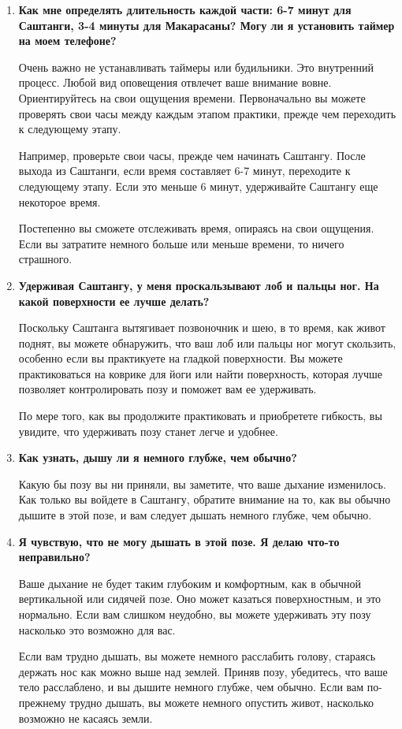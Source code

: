 \documentclass[
a4paper, %
12pt, %
article,
onecolumn, %
openany, %
]{memoir}
\begin{document}
\begin{enumerate}
\item \textbf{Как мне определять длительность каждой части: 6-7 минут для Саштанги, 3-4 минуты для Макарасаны? Могу ли я установить таймер на моем телефоне?}

Очень важно не устанавливать таймеры или будильники. Это внутренний процесс.
Любой вид оповещения отвлечет ваше внимание вовне. Ориентируйтесь на свои ощущения времени. Первоначально вы можете проверять свои часы между каждым этапом практики, прежде чем переходить к следующему этапу.

Например, проверьте свои часы, прежде чем начинать Саштангу. После выхода из Саштанги, если время составляет 6-7 минут, переходите к следующему этапу. Если это меньше 6 минут, удерживайте Саштангу еще некоторое время.

Постепенно вы сможете отслеживать время, опираясь на свои ощущения. Если вы
затратите немного больше или меньше времени, то ничего страшного.

\item \textbf{Удерживая Саштангу, у меня проскальзывают лоб и пальцы ног. На какой
    поверхности ее лучше делать?}

Поскольку Саштанга вытягивает позвоночник и шею, в то время, как живот поднят, вы
можете обнаружить, что ваш лоб или пальцы ног могут скользить, особенно если вы
практикуете на гладкой поверхности. Вы можете практиковаться на коврике для йоги
или найти поверхность, которая лучше позволяет контролировать позу и поможет вам
ее удерживать.

По мере того, как вы продолжите практиковать и приобретете гибкость, вы увидите, что
удерживать позу станет легче и удобнее.
\item \textbf{Как узнать, дышу ли я немного глубже, чем обычно?}

Какую бы позу вы ни приняли, вы заметите, что ваше дыхание изменилось. Как только
вы войдете в Саштангу, обратите внимание на то, как вы обычно дышите в этой позе, и
вам следует дышать немного глубже, чем обычно.

\item \textbf{Я чувствую, что не могу дышать в этой позе. Я делаю что-то неправильно?}

Ваше дыхание не будет таким глубоким и комфортным, как в обычной вертикальной
или сидячей позе. Оно может казаться поверхностным, и это нормально. Если вам
слишком неудобно, вы можете удерживать эту позу насколько это возможно для вас.

Если вам трудно дышать, вы можете немного расслабить голову, стараясь держать нос
как можно выше над землей.
Приняв позу, убедитесь, что ваше тело расслаблено, и вы дышите немного глубже, чем
обычно.
Если вам по-прежнему трудно дышать, вы можете немного опустить живот, насколько
возможно не касаясь земли.

\end{enumerate}
\end{document}

